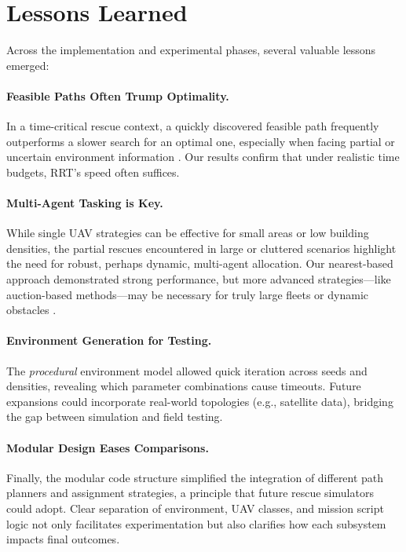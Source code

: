 \documentclass[12pt,a4paper]{report}
\begin{document}
\section{Lessons Learned}
\label{sec:lessons_learned}
Across the implementation and experimental phases, several valuable lessons emerged:

\paragraph{Feasible Paths Often Trump Optimality.}
In a time-critical rescue context, a quickly discovered
feasible path frequently outperforms a slower search for an optimal one, especially
when facing partial or uncertain environment information \cite{Zhang2024ShrinkingPOMCP}. Our
results confirm that under realistic time budgets, RRT’s speed often suffices.

\paragraph{Multi-Agent Tasking is Key.}
While single UAV strategies can be effective for small areas or low building densities,
the partial rescues encountered in large or cluttered scenarios highlight the need
for robust, perhaps dynamic, multi-agent allocation. Our nearest-based approach
demonstrated strong performance, but more advanced strategies—like auction-based
methods—may be necessary for truly large fleets or dynamic obstacles \cite{Dias2006MarketBased}.

\paragraph{Environment Generation for Testing.}
The \emph{procedural} environment model allowed quick iteration across seeds and
densities, revealing which parameter combinations cause timeouts. Future expansions
could incorporate real-world topologies (e.g., satellite data), bridging the gap
between simulation and field testing.

\paragraph{Modular Design Eases Comparisons.}
Finally, the modular code structure simplified the integration of different path
planners and assignment strategies, a principle that future rescue simulators
could adopt. Clear separation of environment, UAV classes, and mission script
logic not only facilitates experimentation but also clarifies how each subsystem
impacts final outcomes.
\end{document}
